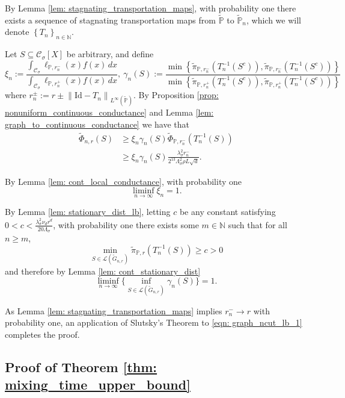 \documentclass{article}
\newcommand{\set}[1]{\left\{#1\right\}}
\newcommand{\seq}[1]{\left\{#1\right\}_{n \in \mathbb{N}}}
\newcommand{\norm}[1]{\left\lVert#1\right\rVert}
\newcommand{\1}{\mathbf{1}}
\newcommand{\Xbf}{X}             %
\newcommand{\Pbb}{\mathbb{P}}
\newcommand{\Cset}{\mathcal{C}}
\newcommand{\Csig}{\Cset_{\sigma}}
\newcommand{\dx}{\,dx}
\newcommand{\piwt}{\widetilde{\pi}}
\theoremstyle{aldenthm}
\theoremstyle{aldenrmrk}
\begin{document}
By Lemma \ref{lem: stagnating_transportation_maps}, with probability one there exists a sequence of stagnating transportation maps from $\widetilde{\Pbb}$ to $\widetilde{\Pbb}_n$, which we will denote $\seq{T_n}$. 

Let $S \subseteq \Csig[\Xbf]$ be arbitrary, and define
\begin{equation*}
\xi_n := \frac{\int_{\Csig} \ell_{\Pbb,r_n^-}(x) f(x) \dx}{\int_{\Csig} \ell_{\Pbb,r_n^+}(x) f(x) \dx},~ \gamma_n(S) := \frac{\min \set{\piwt_{\Pbb,r_n^-}(T_n^{-1}(S^c)), \piwt_{\Pbb,r_n^-}(T_n^{-1}(S^c))} }{\min \set{\piwt_{\Pbb,r_n^+}(T_n^{-1}(S^c)), \piwt_{\Pbb,r_n^+}(T_n^{-1}(S^c))} } 
\end{equation*}
where $r_n^{\pm} := r \pm \norm{\mathrm{Id} - T_n}_{L^{\infty}(\widetilde{\Pbb})}$. By Proposition \ref{prop: nonuniform_continuous_conductance} and Lemma \ref{lem: graph_to_continuous_conductance} we have that
\begin{align}
\widetilde{\Phi}_{n,r}(S) & \geq \xi_n \gamma_n(S) \widetilde{\Phi}_{\Pbb,r_n^{-}}(T_n^{-1}(S)) \nonumber \\
& \geq  \xi_n \gamma_n(S) \frac{\lambda_{\sigma}^2r_n^{-}}{2^{13} \Lambda_{\sigma}^2 \rho L \sqrt{d}}. \label{eqn: graph_ncut_lb_1}
\end{align}

By Lemma \ref{lem: cont_local_conductance}, with probability one
\begin{equation*}
\liminf_{n \to \infty} \xi_n = 1.
\end{equation*}

By Lemma \ref{lem: stationary_dist_lb}, letting $c$ be any constant satisfying $0 < c < \frac{\lambda_{\sigma}^2 \nu_d r^d}{20\Lambda_{\sigma}}$, with probability one there exists some $m \in \mathbb{N}$ such that for all $n \geq m$,
\begin{equation*}
\min_{S \in \mathcal{L}(\widetilde{G}_{n,r})}\piwt_{\Pbb,r}(T_n^{-1}(S)) \geq c > 0
\end{equation*}
and therefore by Lemma \ref{lem: cont_stationary_dist}
\begin{equation*}
\liminf_{n \to \infty} \biggl\{ \inf_{S \in \mathcal{L}(\widetilde{G}_{n,r})} \gamma_n(S)\biggr\} = 1.
\end{equation*}

As Lemma \ref{lem: stagnating_transportation_maps} implies $r_n^{-} \to r$ with probability one, an application of Slutsky's Theorem to \eqref{eqn: graph_ncut_lb_1} completes the proof.

\subsection{Proof of Theorem \ref{thm: mixing_time_upper_bound}}
\label{sec: proof_of_theorem_mixing_time}
\end{document}
